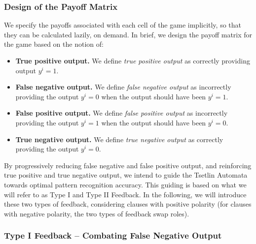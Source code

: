 \documentclass[11pt,a4paper]{article}
\newcommand{\True}{\mbox{1}}
\newcommand{\False}{\mbox{0}}
\begin{document}
\subsubsection{Design of the Payoff Matrix}
We specify the payoffs associated with each cell of the game implicitly, so that they can be calculated lazily, on demand. In brief, we design the payoff matrix for the game based on the notion of:
\begin{itemize}
    \item{\bf True positive output.} We define \emph{true positive output} as correctly providing output $y^i=\True$.
    \item{\bf False negative output.} We define \emph{false negative output} as incorrectly providing the output $y^i=\False$ when the output should have been $y^i=\True$.
    \item{\bf False positive output.} We define \emph{false positive output} as incorrectly providing the output $y^i=\True$ when the output should have been $y^i=\False$.
    \item{\bf True negative output.} We define \emph{true negative output} as correctly providing the output $y^i=\False$.
\end{itemize}
By progressively reducing false negative and false positive output, and reinforcing true positive and true negative output, we intend to guide the Tsetlin Automata towards optimal pattern recognition accuracy. This guiding is based on what we will refer to as Type I and Type II Feedback. In the following, we will 
introduce these two types of feedback, considering clauses with positive polarity (for clauses with negative polarity, the two types of feedback swap roles).

\subsubsection{Type I Feedback -- Combating False Negative Output}\label{sec:type_i_feedback}
\end{document}
